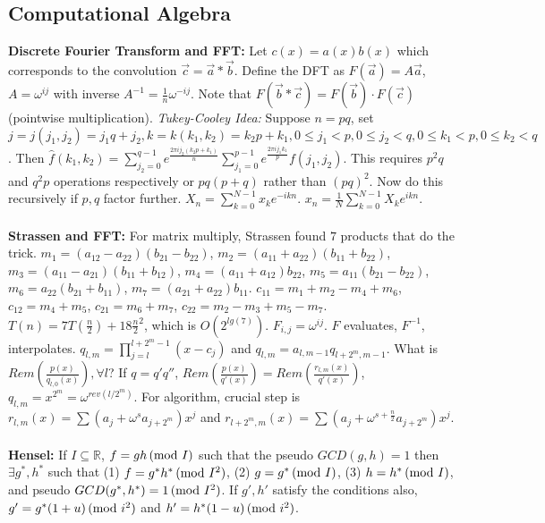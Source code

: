 \subsection {Computational Algebra}
{\bf Discrete Fourier Transform and FFT:} Let $c(x)=a(x)b(x)$ which
corresponds to the convolution ${\vec c} = {\vec a} * {\vec b}$.
Define the DFT as 
$F({\vec a})= A {\vec a}$, $A= \omega^{ij}$ with inverse
$A^{-1}= {\frac 1 n} \omega^{-ij}$.
Note that $F({\vec b} * {\vec c})= F({\vec b}) \cdot F({\vec c})$ (pointwise multiplication).
\emph{Tukey-Cooley Idea:} Suppose $n=pq$, set 
$j=j(j_1,j_2)= j_1 q +j_2, k=k(k_1 , k_2)= k_2p+k_1,
0 \le j_1 <p, 0 \le j_2 <q, 0 \le k_1 <p, 0 \le k_2 <q$.  Then
${\hat f}(k_1, k_2)= 
\sum_{j_2=0}^{q-1}
e^{\frac {2 \pi i j_2 (k_2p+k_1)} {n}}
\sum_{j_1=0}^{p-1}
e^{\frac {2 \pi i j_1 k_1} {p}} f(j_1 , j_2)$.  This requires $p^2q$ and $q^2p$ operations
respectively or $pq(p+q)$ rather than $(pq)^2$.  
Now do this recursively if $p, q$ factor further.
$X_n = \sum_{k=0}^{N-1} x_k e^{-ikn}$.
$x_n = {\frac 1 N} \sum_{k=0}^{N-1} X_k e^{ikn}$.
\\
\\
{\bf Strassen and FFT:}  For matrix multiply, Strassen found $7$ products that do the trick.
$m_1= (a_{12} - a_{22}) (b_{21} - b_{22})$,
$m_2= (a_{11} + a_{22}) (b_{11} + b_{22})$,
$m_3= (a_{11} - a_{21}) (b_{11} + b_{12})$,
$m_4= (a_{11} + a_{12}) b_{22}$,
$m_5= a_{11} (b_{21} - b_{22})$,
$m_6= a_{22} (b_{21} + b_{11})$,
$m_7= (a_{21} + a_{22}) b_{11}$.
$c_{11}= m_1 + m_2 -m_4 + m_6$,
$c_{12}= m_4 + m_5$,
$c_{21}= m_6 + m_7$,
$c_{22}= m_2 - m_3 + m_5 - m_7$.  $T(n)= 7 T({\frac n 2}) + 18 {\frac n 2}^2$, which is
$O(2^{lg(7)})$. $F_{i,j}= \omega^{ij}$.  $F$ evaluates, $F^{-1}$, interpolates.
$q_{l,m} = \prod_{j=l}^{l+2^m-1} (x-c_j)$ and $q_{l,m}= a_{l, m-1} q_{l+2^m,m-1}$.
What is $Rem({\frac {p(x)} {q_{l,0}(x)}}), \forall l$?  If $q= q' q''$, 
$Rem({\frac {p(x)} {q'(x)}}) =Rem({\frac {r_{l,m}(x)} {q'(x)}})$,
$q_{l,m}= x^{2^m} =\omega^{rev(l/2^m)}$.  For algorithm, crucial step is
$r_{l,m}(x) =\sum (a_j + \omega^s a_{j+2^m}) x^j$ and
$r_{l+2^m,m}(x) =\sum (a_j + \omega^{s+ {\frac n 2}} a_{j+2^m}) x^j$.
\\
\\
{\bf Hensel:}  If $I \subseteq {\mathbb R}$, $f=gh \thinspace \textnormal{(mod } I \textnormal{)}$ such that the pseudo 
$GCD(g,h)=1$ then
$\exists g^*,h^*$ such that (1) $f= g^* h^* \thinspace \textnormal{(mod } I^2 \textnormal{)}$,
(2) $g=g^* \thinspace \textnormal{(mod } I \textnormal{)}$,
(3) $h=h^* \thinspace \textnormal{(mod } I \textnormal{)}$, and pseudo $GCD(g^*,h^*)=1 \thinspace \textnormal{(mod } I^2 \textnormal{)}$.
If $g', h'$ satisfy the conditions also, 
$g'=g^*(1+u) \thinspace \textnormal{(mod } i^2 \textnormal{)}$ and
$h'=h^*(1-u) \thinspace \textnormal{(mod } i^2 \textnormal{)}$.
